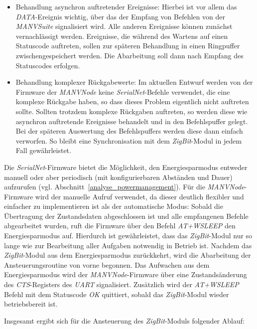 \begin{itemize}
    \item{Behandlung asynchron auftretender Ereignisse:} Hierbei ist vor allem das \emph{DATA}-Ereignis wichtig, über das
    der Empfang von Befehlen von der \emph{MANVSuite} signalisiert wird. Alle anderen Ereignisse können zunächst vernachlässigt
    werden. Ereignisse, die während des Wartens auf einen Statuscode auftreten, sollen zur späteren Behandlung in einen
    Ringpuffer zwischengespeichert werden. Die Abarbeitung soll dann nach Empfang des Statuscodes erfolgen.

    \item{Behandlung komplexer Rückgabewerte:} Im aktuellen Entwurf werden von der Firmware der \emph{MANVNode} keine 
    \emph{SerialNet}-Befehle verwendet, die eine komplexe Rückgabe haben, so dass dieses Problem eigentlich nicht auftreten 
    sollte. Sollten trotzdem komplexe Rückgaben auftreten, so werden diese wie asynchron auftretende Ereignisse behandelt
    und in den Befehlspuffer gelegt. Bei der späteren Auswertung des Befehlspuffers werden diese dann einfach verworfen.
    So bleibt eine Synchronisation mit dem \emph{ZigBit}-Modul in jedem Fall gewährleistet.
\end{itemize}

Die \emph{SerialNet}-Firmware bietet die Möglichkeit, den Energiesparmodus entweder manuell oder aber  
periodisch (mit konfigurierbaren Abständen und Dauer) aufzurufen (vgl. Abschnitt~\ref{analyse_powermanagement}). Für die
\emph{MANVNode}-Firmware wird der manuelle Aufruf verwendet, da dieser deutlich flexibler und einfacher zu
implementieren ist als der automatische Modus: Sobald die Übertragung der Zustandsdaten abgeschlossen ist und
alle empfangenen Befehle abgearbeitet wurden, ruft die Firmware über den Befehl \emph{AT+WSLEEP} den Energiesparmodus
auf. Hierdurch ist gewährleistet, dass das \emph{ZigBit}-Modul nur so lange wie zur Bearbeitung aller Aufgaben
notwendig in Betrieb ist. Nachdem das \emph{ZigBit}-Modul aus dem Energiesparmodus zurückkehrt, wird die Abarbeitung
der Ansteuerungsroutine von vorne begonnen. Das Aufwachen aus dem Energiesparmodus wird der \emph{MANVNode}-Firmware
über eine Zustandsänderung des \emph{CTS}-Registers des \emph{UART} signalisiert. Zusätzlich wird der \emph{AT+WSLEEP}
Befehl mit dem Statuscode \emph{OK} quittiert, sobald das \emph{ZigBit}-Modul wieder betriebsbereit ist. 


Insgesamt ergibt sich für die Ansteuerung des \emph{ZigBit}-Moduls folgender Ablauf:


